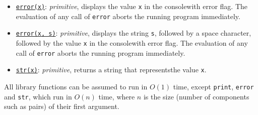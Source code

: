 \begin{itemize}
\item \href{https://sourceacademy.org/sicpjs/1.2.6\#footnote-7}{\texttt{error(x)}}: \textit{primitive}, displays the value \texttt{x} in the console\footnotemark[\value{footnote}] with error flag. The evaluation
  of any call of \texttt{error} aborts the running program immediately.
\item \href{https://sourceacademy.org/sicpjs/2.1.3\#footnote-2}{\texttt{error(x, s)}}: \textit{primitive}, displays the string \texttt{s}, followed by a space character, followed by the value \texttt{x} in the console\footnotemark[\value{footnote}] with error flag. The evaluation
  of any call of \texttt{error} aborts the running program immediately.
\item \href{https://sourceacademy.org/sicpjs/3.3.4\#p24}{\lstinline{str(x)}}: \textit{primitive}, returns a string that represents\footnotemark[\value{footnote}] the value \texttt{x}. 
\end{itemize}
All library functions can be assumed to run
in $O(1)$ time, except \texttt{print}, \texttt{error} and \texttt{str}, 
which run in $O(n)$ time, where $n$ is
the size (number of components such as pairs) of their first argument.
